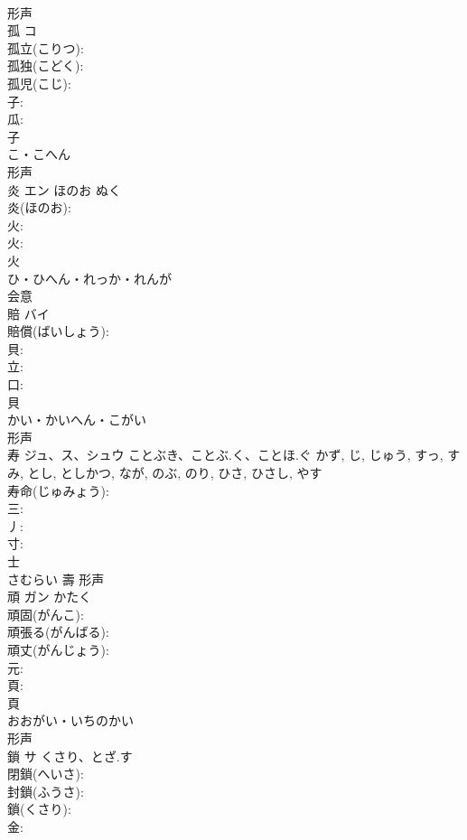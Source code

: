 \documentclass[8pt]{extreport}
\begin{document}
\begin{CJK}{UTF8}{min}
\\	形声 
\\	孤	コ			
\\	孤立(こりつ): 
\\	孤独(こどく): 
\\	孤児(こじ): 
\\	子: 
\\	瓜: 
\\	子	
\\	こ・こへん	
\\	形声 
\\	炎	エン	ほのお	ぬく	
\\	炎(ほのお): 
\\	火: 
\\	火: 
\\	火	
\\	ひ・ひへん・れっか・れんが	
\\	会意 
\\	賠	バイ			
\\	賠償(ばいしょう): 
\\	貝: 
\\	立: 
\\	口: 
\\	貝	
\\	かい・かいへん・こがい	
\\	形声 
\\	寿	ジュ、ス、シュウ	ことぶき、ことぶ.く、ことほ.ぐ	かず, じ, じゅう, すっ, すみ, とし, としかつ, なが, のぶ, のり, ひさ, ひさし, やす	
\\	寿命(じゅみょう): 
\\	三: 
\\	丿: 
\\	寸: 
\\	士	
\\	さむらい	壽	形声 
\\	頑	ガン	かたく		
\\	頑固(がんこ): 
\\	頑張る(がんばる): 
\\	頑丈(がんじょう): 
\\	元: 
\\	頁: 
\\	頁	
\\	おおがい・いちのかい	
\\	形声 
\\	鎖	サ	くさり、とざ.す		
\\	閉鎖(へいさ): 
\\	封鎖(ふうさ): 
\\	鎖(くさり): 
\\	金: 

\end{CJK}
\end{document}
